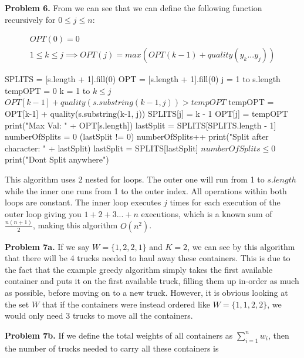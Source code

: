 \documentclass{article}
\begin{document}
\hfill

\textbf{Problem 6.} From \cite{website:6} we can see that we can define the following function recursively for $0 \leq j \leq n$:

\begin{gather}
    OPT(0) = 0 \\
    1 \leq k \leq j \implies OPT(j) = max(OPT(k-1) + quality(y_k...y_j))
\end{gather}

\begin{codebox}
    \li SPLITS = [s.length + 1].fill(0)
    \li OPT = [s.length + 1].fill(0)
    \li
    \li \For j = 1 to s.length \Do
    \li tempOPT = 0
    \li \For k = 1 to $k \leq j$ \Do
    \li \If $OPT[k-1] + quality(s.substring(k-1, j)) > tempOPT$ \Then
    \li tempOPT = OPT[k-1] + quality(s.substring(k-1, j))
    \li SPLITS[j] = k - 1 \End \End 
    \li OPT[j] = tempOPT \End
    \li print("Max Val: " + OPT[s.length])
    \li
    \li lastSplit = SPLITS[SPLITS.length - 1]
    \li numberOfSplits = 0
    \li
    \li \While (lastSplit != 0) \Do
    \li numberOfSplits++
    \li print("Split after character: " + lastSplit)
    \li lastSplit = SPLITS[lastSplit] \End
    \li
    \li \If $numberOfSplits \leq 0$ \Then 
    \li \Return print("Dont Split anywhere") \End
\end{codebox}

This algorithm uses 2 nested for loops. The outer one will run from 1 to $s.length$ while the inner one runs from 1 to the outer index. All operations within both loops are constant. The inner loop executes $j$ times for each execution of the outer loop giving you $1+2+3...+n$ executions, which is a known sum of $\frac{n(n+1)}{2}$, making this algorithm $O(n^2)$.

\hfill

\textbf{Problem 7a.} If we say $W = \{1, 2, 2, 1\}$ and $K = 2$, we can see by this algorithm that there will be 4 trucks needed to haul away these containers. This is due to the fact that the example greedy algorithm simply takes the first available container and puts it on the first available truck, filling them up in-order as much as possible, before moving on to a new truck. However, it is obvious looking at the set $W$ that if the containers were instead ordered like $W = \{1, 1, 2, 2\}$, we would only need 3 trucks to move all the containers.

\hfill

\textbf{Problem 7b.} If we define the total weights of all containers as $\sum_{i=1}^{n} w_i$, then the number of trucks needed to carry all these containers is 
\end{document}
